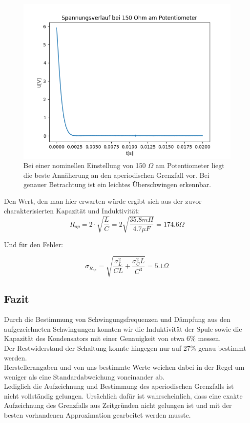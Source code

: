 \documentclass[12pt,a4paper]{article}
\begin{document}
\begin{figure}
\begin{center}
\includegraphics[scale=0.7]{Bilder/Spannungsverlauf150Ohm}
\caption{Bei einer nominellen Einstellung von 150 $\Omega$ am Potentiometer liegt die beste Annäherung an den aperiodischen Grenzfall vor. Bei genauer Betrachtung ist ein leichtes Überschwingen erkennbar.}
\label{fig:Aperiodisch}
\end{center}
\end{figure}


Den Wert, den man hier erwarten würde ergibt sich aus der zuvor charakterisierten Kapazität und Induktivität:
\begin{equation}
R_{ap}=2\cdot \sqrt{\frac{L}{C}}=2\sqrt{\frac{35.8mH}{4.7\mu F}}=174.6\Omega
\end{equation}

Und für den Fehler:

\begin{equation}
\sigma_{R_{ap}}=\sqrt{\frac{\sigma_L^2}{CL}+\frac{\sigma_C^2 L}{C^3}}=5.1 \Omega
\end{equation}



\subsection{Fazit}
Durch die Bestimmung von Schwingungsfrequenzen und Dämpfung aus den aufgezeichneten Schwingungen konnten wir die Induktivität der Spule sowie die Kapazität des Kondensators mit einer Genauigkeit von etwa 6\% messen.\\
Der Restwiderstand der Schaltung konnte hingegen nur auf 27\% genau bestimmt werden.\\
Herstellerangaben und von uns bestimmte Werte weichen dabei in der Regel um weniger als eine Standardabweichung voneinander ab.\\
Lediglich die Aufzeichnung und Bestimmung des aperiodischen Grenzfalls ist nicht vollständig gelungen. Ursächlich dafür ist wahrscheinlich, dass eine exakte Aufzeichnung des Grenzfalls aus Zeitgründen nicht gelungen ist und mit der besten vorhandenen Approximation gearbeitet werden musste.
\end{document}
